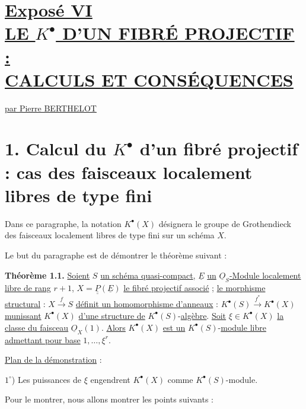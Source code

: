 
\section*{\underline{Exposé VI}\\[3pt] \underline{\underline{LE \(K^{\bullet}\) D'UN FIBRÉ PROJECTIF :}}\\[3pt] \underline{\underline{CALCULS ET CONSÉQUENCES}}}
\renewcommand{\Sym}{\mathbf{S}}
\renewcommand{\Projz}{\underline{\operatorname{Proj}}_0}
\begin{center}
\underline{par Pierre BERTHELOT}
\end{center}

\section*{1. Calcul du \(K^{\bullet}\) d'un fibré projectif : cas des faisceaux localement libres de type fini}

Dans ce paragraphe, la notation \(K^{\bullet}(X)\) désignera le groupe de Grothendieck des faisceaux localement libres de type fini sur un schéma \(X\).

Le but du paragraphe est de démontrer le théorème suivant :

\textbf{Théorème 1.1.} \uline{Soient} \(S\) \uline{un schéma quasi-compact}, \(\underline{E}\) \uline{un} \(\underline{O}_S\)\uline{-Module localement libre de rang} \(r+1\), \(X=\underline{\underline{P}}(\underline{E})\) \uline{le fibré projectif associé} ; \uline{le morphisme structural} : \(X\xrightarrow{f}S\) \uline{définit un homomorphisme d'anneaux} : \(K^{\bullet}(S) \xrightarrow{f^*} K^{\bullet}(X)\) \uline{munissant} \(K^{\bullet}(X)\) \uline{d'une structure de} \(K^{\bullet}(S)\)-\uline{algèbre}. \uline{Soit} \(\xi\in K^{\bullet}(X)\) \uline{la classe du faisceau} \(\underline{O}_X(1)\). \uline{Alors} \(K^{\bullet}(X)\) \uline{est un} \(K^{\bullet}(S)\)-\uline{module libre admettant pour base} \(1,\ldots,\xi^r\).

\uline{Plan de la démonstration} :

\(1^\circ\)) Les puissances de \(\xi\) engendrent \(K^{\bullet}(X)\) comme \(K^{\bullet}(S)\)-module.

Pour le montrer, nous allons montrer les points suivants :

